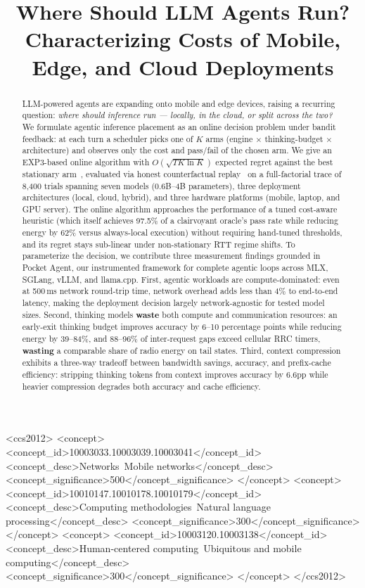 \documentclass[sigconf,anonymous,review]{acmart}
\begin{document}
\title{Where Should LLM Agents Run? Characterizing Costs of Mobile, Edge, and Cloud Deployments}

\begin{abstract}
LLM-powered agents are expanding onto mobile and edge devices, raising a recurring question: \emph{where should inference run --- locally, in the cloud, or split across the two?}
We formulate agentic inference placement as an online decision problem under bandit feedback: at each turn a scheduler picks one of $K$ arms (engine $\times$ thinking-budget $\times$ architecture) and observes only the cost and pass/fail of the chosen arm.
We give an EXP3-based online algorithm with $O(\sqrt{TK \ln K})$ expected regret against the best stationary arm~\cite{auer2002nonstochastic}, evaluated via honest counterfactual replay~\cite{li2011unbiased} on a full-factorial trace of 8{,}400 trials spanning seven models (0.6B--4B parameters), three deployment architectures (local, cloud, hybrid), and three hardware platforms (mobile, laptop, and GPU server).
The online algorithm approaches the performance of a tuned cost-aware heuristic (which itself achieves 97.5\% of a clairvoyant oracle's pass rate while reducing energy by 62\% versus always-local execution) without requiring hand-tuned thresholds, and its regret stays sub-linear under non-stationary RTT regime shifts.
To parameterize the decision, we contribute three measurement findings grounded in Pocket Agent, our instrumented framework for complete agentic loops across MLX, SGLang, vLLM, and llama.cpp.
First, agentic workloads are compute-dominated: even at 500\,ms network round-trip time, network overhead adds less than 4\% to end-to-end latency, making the deployment decision largely network-agnostic for tested model sizes.
Second, thinking models \textbf{waste} both compute and communication resources: an early-exit thinking budget improves accuracy by 6--10 percentage points while reducing energy by 39--84\%, and 88--96\% of inter-request gaps exceed cellular RRC timers, \textbf{wasting} a comparable share of radio energy on tail states.
Third, context compression exhibits a three-way tradeoff between bandwidth savings, accuracy, and prefix-cache efficiency: stripping thinking tokens from context improves accuracy by 6.6pp while heavier compression degrades both accuracy and cache efficiency.
\end{abstract}

\begin{CCSXML}
<ccs2012>
  <concept>
    <concept_id>10003033.10003039.10003041</concept_id>
    <concept_desc>Networks~Mobile networks</concept_desc>
    <concept_significance>500</concept_significance>
  </concept>
  <concept>
    <concept_id>10010147.10010178.10010179</concept_id>
    <concept_desc>Computing methodologies~Natural language processing</concept_desc>
    <concept_significance>300</concept_significance>
  </concept>
  <concept>
    <concept_id>10003120.10003138</concept_id>
    <concept_desc>Human-centered computing~Ubiquitous and mobile computing</concept_desc>
    <concept_significance>300</concept_significance>
  </concept>
</ccs2012>
\end{CCSXML}
\end{document}
